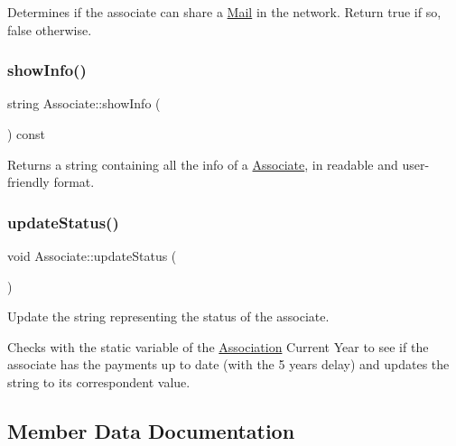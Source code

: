 Determines if the associate can share a \mbox{\hyperlink{classMail}{Mail}} in the network. Return true if so, false otherwise. 

\mbox{\label{classAssociate_a5a47029128dc79e09527552c244da9af}} 
\subsubsection{\texorpdfstring{show\+Info()}{showInfo()}}
{\footnotesize\ttfamily string Associate\+::show\+Info (\begin{DoxyParamCaption}{ }\end{DoxyParamCaption}) const}



Returns a string containing all the info of a \mbox{\hyperlink{classAssociate}{Associate}}, in readable and user-\/friendly format. 

\mbox{\label{classAssociate_aec791e8d29c2c8ccf9769a6ac49a3af5}} 
\subsubsection{\texorpdfstring{update\+Status()}{updateStatus()}}
{\footnotesize\ttfamily void Associate\+::update\+Status (\begin{DoxyParamCaption}{ }\end{DoxyParamCaption})}



Update the string representing the status of the associate. 

Checks with the static variable of the \mbox{\hyperlink{classAssociation}{Association}} Current Year to see if the associate has the payments up to date (with the 5 years delay) and updates the string to its correspondent value. 

\subsection{Member Data Documentation}
\mbox{\label{classAssociate_a7871837a4c80adb4e39f2f67ae1bfce5}} 

